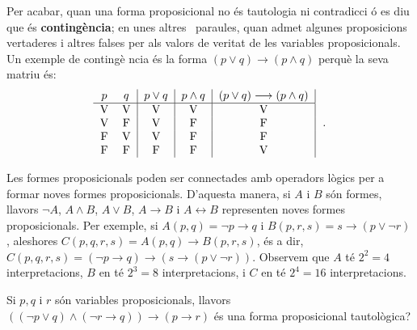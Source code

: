 Per acabar, quan una forma proposicional no \'{e}s tautologia ni contradicci%
\'{o} es diu que \'{e}s \textbf{conting\`{e}ncia}; en unes altres \
paraules, quan admet algunes proposicions vertaderes i altres falses per als
valors de veritat de les variables proposicionals. Un exemple de conting\`{e}%
ncia \'{e}s la forma $(p\vee q)\longrightarrow(p\wedge q)$ perqu\`{e} la
seva matriu \'{e}s:%
\begin{equation*}
\begin{tabular}{cc|c|c|c|}
$p$ & $q$ & $p\vee q$ & $p\wedge q$ & $(p\vee q)\longrightarrow(p\wedge q)$
\\ \hline
V & V & V & V & V \\
V & F & V & F & F \\
F & V & V & F & F \\
F & F & F & F & V%
\end{tabular}
\text{.}
\end{equation*}

\bigskip

Les formes proposicionals poden ser connectades amb operadors l\`{o}gics per
a formar noves formes proposicionals. D'aquesta manera, si $A$ i $B$ s\'{o}n
formes, llavors $\lnot A$, $A\wedge B$, $A\vee B$, $A\longrightarrow B$ i $%
A\longleftrightarrow B$ representen noves formes proposicionals. Per
exemple, si $A(p,q)=\lnot p\longrightarrow q$ i $B(p,r,s)=s\longrightarrow%
\left( p\vee\lnot r\right) $, aleshores $C(p,q,r,s)=A(p,q)\longrightarrow
B(p,r,s)$, \'{e}s a dir, $C(p,q,r,s)=\left( \lnot p\longrightarrow q\right)
\longrightarrow\left( s\longrightarrow\left( p\vee\lnot r\right) \right) $.
Observem que $A$ t\'{e} $2^{2}=4$ interpretacions, $B$ en t\'{e} $2^{3}=8$
interpretacions, i $C$ en t\'{e} $2^{4}=16$ interpretacions.

\begin{exemple}
Si $p,q$ i $r$ s\'{o}n variables proposicionals, llavors $\left( \left(
\lnot p\vee q\right) \wedge\left( \lnot r\longrightarrow q\right) \right)
\longrightarrow\left( p\longrightarrow r\right) $ \'{e}s una forma
proposicional tautol\`{o}gica?
\end{exemple}

